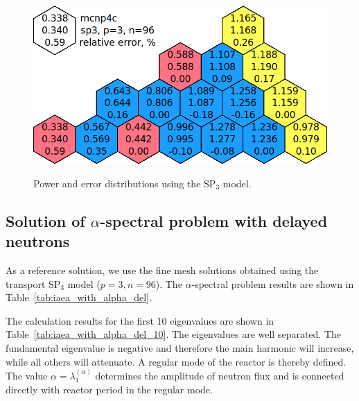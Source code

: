 \documentclass[a4paper]{jpconf}
\begin{document}
\begin{figure}[htp]
\begin{center}
	\includegraphics[width=0.7\linewidth]{sp3.png}\\
	\caption{Power and error distributions using the $\mathrm{SP_3}$ model.}
	\label{fig:power_iaea_with_sp3}
\end{center}
\end{figure}

\subsection{Solution of $\alpha$-spectral problem with delayed neutrons}

As a reference solution, we use the fine mesh solutions obtained using the transport $\mathrm{SP_3}$ model ($ p = 3, n = 96 $).
The $\alpha$-spectral problem results are shown in Table~\ref{tab:iaea_with_alpha_del}.

The calculation results for the first 10 eigenvalues are shown in Table~\ref{tab:iaea_with_alpha_del_10}.
The eigenvalues are well separated. 
The fundamental eigenvalue is negative and therefore the main harmonic will increase, while all others will attenuate. 
A regular mode of the reactor is thereby defined.
The value $\alpha = \lambda_1^{(\alpha)}$ determines the amplitude of neutron flux and is connected directly with reactor period in the regular mode.
\end{document}
